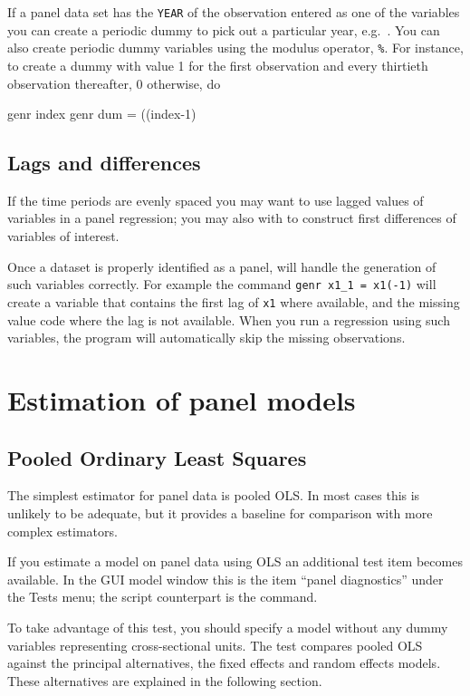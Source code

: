 If a panel data set has the \verb+YEAR+ of the observation entered as
one of the variables you can create a periodic dummy to pick out a
particular year, e.g.\ .  You can also
create periodic dummy variables using the modulus operator,
\verb+%+.  For instance, to create a dummy with
value 1 for the first observation and every thirtieth observation
thereafter, 0 otherwise, do
\begin{code}
      genr index 
      genr dum = ((index-1)%
\end{code}

\subsection{Lags and differences}
\label{panel-lagged}

If the time periods are evenly spaced you may want to use lagged
values of variables in a panel regression; you may also with to
construct first differences of variables of interest.

Once a dataset is properly identified as a panel,  will
handle the generation of such variables correctly.  For example the
command \verb+genr x1_1 = x1(-1)+ will create a variable that contains
the first lag of \verb+x1+ where available, and the missing value code
where the lag is not available.  When you run a regression using such
variables, the program will automatically skip the missing
observations.

\section{Estimation of panel models}

\subsection{Pooled Ordinary Least Squares}
\label{pooled-est}

The simplest estimator for panel data is pooled OLS.  In most cases
this is unlikely to be adequate, but it provides a baseline for
comparison with more complex estimators.

If you estimate a model on panel data using OLS an additional test
item becomes available.  In the GUI model window this is the item
``panel diagnostics'' under the \textsf{Tests} menu; the script
counterpart is the  command.

To take advantage of this test, you should specify a model without any
dummy variables representing cross-sectional units.  The test compares
pooled OLS against the principal alternatives, the fixed effects and
random effects models.  These alternatives are explained in the
following section.

